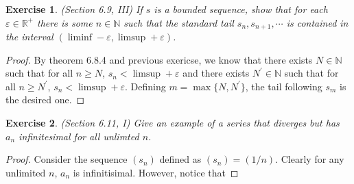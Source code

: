 \documentclass[a4paper, 11pt]{book}
\theoremstyle{plain}
\newtheorem{exercise}{Exercise}[chapter]
\theoremstyle{plain}
\newcommand{\N}{\mathbb{N}}
\newcommand{\R}{\mathbb{R}}
\newcommand{\p}{\prime}
\newcommand{\ep}{\varepsilon}
\begin{document}
  \begin{exercise}
    (Section 6.9, III)
    If $s$ is a bounded sequence, show that for each $\ep \in \R^+$ there is some $n \in \N$ such that the standard tail $s_n, s_{n+1}, \cdots$ is contained in the interval $(\liminf-\ep, \limsup+\ep)$.
  \end{exercise}
  \begin{proof}
    By theorem 6.8.4 and previous exericse, we know that there exists $N \in \N$ such that for all $n\geq N$, $s_n<\limsup+\ep$ and there exists $N^\p \in \N$ such that for all $n\geq N^\p$, $s_n<\limsup+\ep$. Defining $m=\max\{N, N^\p\}$, the tail following $s_m$ is the desired one.
  \end{proof}

  \begin{exercise}
    (Section 6.11, I)
    Give an example of a series that diverges but has $a_n$ infinitesimal for all unlimted $n$.
  \end{exercise}
  \begin{proof}
    Consider the sequence $(s_n)$ defined as $(s_n)=(1/n)$. Clearly for any unlimited $n$, $a_n$ is infinitisimal. However, notice that 

  \end{proof}
\end{document}
